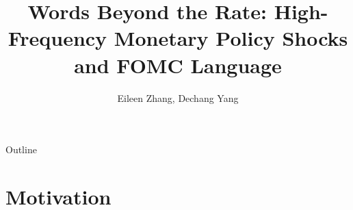\documentclass[aspectratio=169, 11pt]{beamer}
\title[Words Beyond the Rate]{Words Beyond the Rate: High-Frequency Monetary Policy Shocks and FOMC Language}
\author[Zhang \& Yang]{Eileen Zhang, Dechang Yang}
\date[XJTLU, 2026]{}
\institute{Xi'an Jiaotong-Liverpool University}
\begin{document}
\begin{frame}[plain]
\titlepage
\end{frame}

\begin{frame}{Outline}
\tableofcontents
\end{frame}

\section{Motivation}
\end{document}
